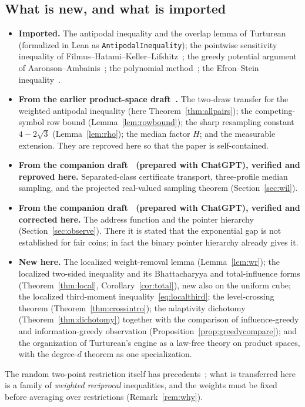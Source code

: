 \documentclass[11pt]{article}
\numberwithin{equation}{section}
\theoremstyle{definition}
\theoremstyle{remark}
\newcommand{\1}{\mathbf 1}
\begin{document}
\subsection{What is new, and what is imported}
\begin{itemize}[leftmargin=*,itemsep=1pt]
\item \textbf{Imported.} The antipodal inequality and the overlap lemma of Turturean~\cite[Theorem~4.3, Lemma~4.1]{Tur26} (formalized in Lean as \texttt{AntipodalInequality}); the pointwise sensitivity inequality of Filmus--Hatami--Keller--Lifshitz~\cite[Theorem~3.3]{FHKL16}; the greedy potential argument of Aaronson--Ambainis~\cite{AA14}; the polynomial method~\cite{BBCMW01}; the Efron--Stein inequality~\cite{ES81}.
\item \textbf{From the earlier product-space draft~\cite{Wri26}.} The two-draw transfer for the weighted antipodal inequality (here Theorem~\ref{thm:allpairs}); the competing-symbol row bound (Lemma~\ref{lem:rowbound}); the sharp resampling constant $4-2\sqrt3$ (Lemma~\ref{lem:rho}); the median factor $H$; and the measurable extension. They are reproved here so that the paper is self-contained.
\item \textbf{From the companion draft~\cite{WriWIL} (prepared with ChatGPT), verified and reproved here.} Separated-class certificate transport, three-profile median sampling, and the projected real-valued sampling theorem (Section~\ref{sec:wil}).
\item \textbf{From the companion draft~\cite{WriAO} (prepared with ChatGPT), verified and corrected here.} The address function and the pointer hierarchy (Section~\ref{sec:observe}). There it is stated that the exponential gap is not established for fair coins; in fact the binary pointer hierarchy already gives it.
\item \textbf{New here.} The localized weight-removal lemma (Lemma~\ref{lem:wr}); the localized two-sided inequality and its Bhattacharyya and total-influence forms (Theorem~\ref{thm:local}, Corollary~\ref{cor:total}), new also on the uniform cube; the localized third-moment inequality~\eqref{eq:localthird}; the level-crossing theorem (Theorem~\ref{thm:crossintro}); the adaptivity dichotomy (Theorem~\ref{thm:dichotomy}) together with the comparison of influence-greedy and information-greedy observation (Proposition~\ref{prop:greedycompare}); and the organization of Turturean's engine as a law-free theory on product spaces, with the degree-$d$ theorem as one specialization.
\end{itemize}
The random two-point restriction itself has precedents~\cite{Rei00,KSS11,FYYZ26}; what is transferred here is a family of \emph{weighted reciprocal} inequalities, and the weights must be fixed before averaging over restrictions (Remark~\ref{rem:why}).
\end{document}
